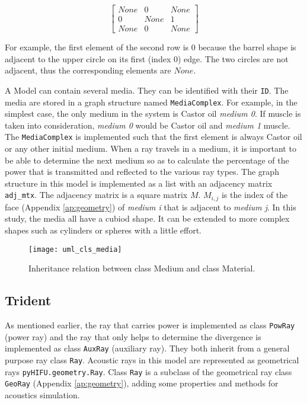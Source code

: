 \[
\begin{bmatrix}
    None & 0 & None \\
    0 & None & 1 \\
    None & 0 & None
\end{bmatrix}
\]

For example, the first element of the second row is $0$ because the barrel shape is adjacent to the upper circle on its first (index 0) edge. The two circles are not adjacent, thus the corresponding elements are $None$.

A Model can contain several media. They can be identified with their \texttt{ID}. The media are stored in a graph structure named \texttt{MediaComplex}. For example, in the simplest case, the only medium in the system is Castor oil \textit{medium 0}. If muscle is taken into consideration, \textit{medium 0} would be Castor oil and \textit{medium 1} muscle. The \texttt{MediaComplex} is implemented such that the first element is always Castor oil or any other initial medium. When a ray travels in a medium, it is important to be able to determine the next medium so as to calculate the percentage of the power that is transmitted and reflected to the various ray types. The graph structure in this model is implemented as a list with an adjacency matrix \texttt{adj\_mtx}. The adjacency matrix is a square matrix $M$. $M_{i,j}$ is the index of the face (Appendix \ref{ap:geometry}) of \textit{medium i} that is adjacent to \textit{medium j}. In this study, the media all have a cubiod shape. It can be extended to more complex shapes such as cylinders or spheres with a little effort.

\begin{figure}[h]
    \centering
    \texttt{[image: uml\_cls\_media]}
    \caption{Inheritance relation between class Medium and class Material.}
    \label{fig:uml_cls_media}
\end{figure}

\subsection{Trident} \label{ssec:trident}
As mentioned earlier, the ray that carries power is implemented as class \texttt{PowRay} (power ray) and the ray that only helps to determine the divergence is implemented as class \texttt{AuxRay} (auxiliary ray). They both inherit from a general purpose ray class \texttt{Ray}. Acoustic rays in this model are represented as geometrical rays \texttt{pyHIFU.geometry.Ray}. Class \texttt{Ray} is a subclass of the geometrical ray class \texttt{GeoRay} (Appendix \ref{ap:geometry}), adding some properties and methods for acoustics simulation.


